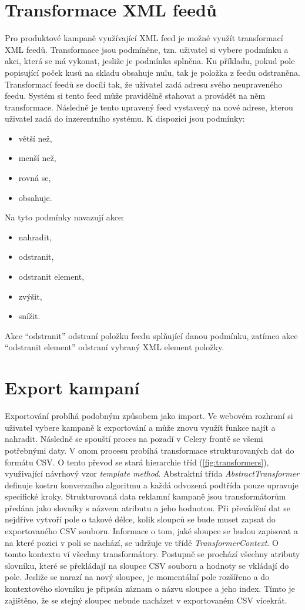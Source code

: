 \section{Transformace XML feedů}
Pro produktové kampaně využívající XML feed je možné využít transformací XML feedů. Transformace jsou podmíněne, tzn. uživatel si vybere podmínku a akci, která se má
vykonat, jesliže je podmínka splněna. Ku příkladu, pokud pole popisující poček kusů na skladu obsahuje nulu, tak je položka z feedu odstraněna. Transformací feedů
se docílí tak, že uživatel zadá adresu svého neupraveného feedu. Systém si tento feed může pravidělně stahovat a provádět na něm transformace. Následně je tento upravený
feed vystavený na nové adrese, kterou uživatel zadá do inzerentního systému. K dispozici jsou podmínky:
\begin{itemize}
    \item větší než,
    \item menší než,
    \item rovná se,
    \item obsahuje.
\end{itemize}
Na tyto podmínky navazují akce:
\begin{itemize}
    \item nahradit,
    \item odstranit,
    \item odstranit element,
    \item zvýšit,
    \item snížit.
\end{itemize}
Akce \enquote{odstranit} odstraní položku feedu splňující danou podmínku, zatímco akce \enquote{odstranit element}
odstraní vybraný XML element položky.


\section{Export kampaní}
Exportování probíhá podobným způsobem jako import. Ve webovém rozhraní si uživatel vybere kampaně k exportování a může znovu využít funkce najít a nahradit.
Následně se spouští proces na pozadí v Celery frontě se všemi potřebnými daty. V onom procesu probíhá transformace strukturovaných dat do
formátu CSV. O tento převod se stará hierarchie tříd (\ref{fig:transformers}), využivající návrhový vzor \emph{template method}.
Abstraktní třída \emph{AbstractTransformer} definuje kostru konverzního algoritmu a každá odvozená podtřída pouze upravuje specifické
kroky. Strukturovaná data reklamní kampaně jsou transformátorům předána jako slovníky s názvem atributu a jeho hodnotou.
Při převádění dat se nejdříve vytvoří pole o takové délce, kolik sloupců se bude muset zapsat do exportovaného CSV souboru. Informace o tom, jaké sloupce
se budou zapisovat a na které pozici v poli se nachází, se udržuje ve třídě \emph{TransformerContext}. O tomto kontextu ví všechny transformátory.
Postupně se prochází všechny atributy slovníku, které se překládají na sloupec CSV souboru a hodnoty se vkládají do pole.
Jesliže se narazí na nový sloupec, je momentální pole rozšířeno a do kontextového slovníku je připsán záznam o názvu sloupce a jeho index. 
Tímto je zajištěno, že se stejný sloupec nebude nacházet v exportovaném CSV vícekrát.


